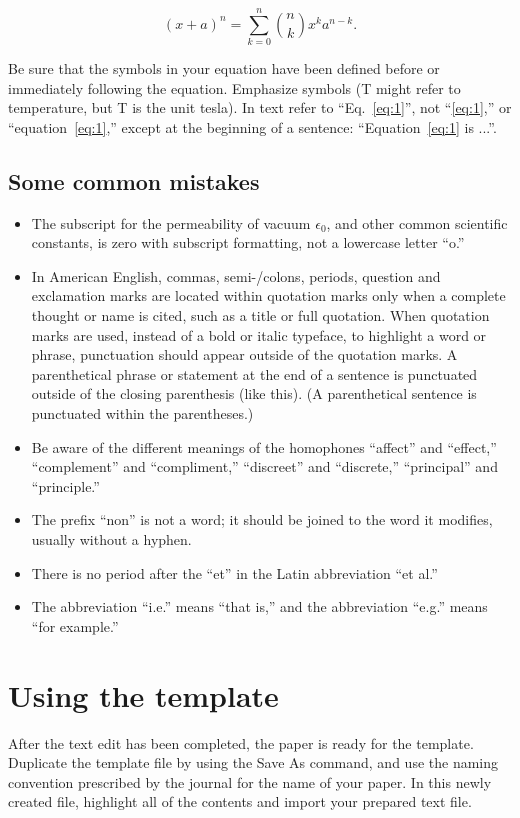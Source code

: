 \documentclass[10pt,twoside,twocolumn,a4paper]{article}
\begin{document}
\begin{equation} \label{eq:1}
(x + a)^n = \sum_{k=0}^{n} \binom{n}{k} x^k a^{n-k}.
\end{equation}

 Be sure that the symbols in your equation have been defined before or immediately following the equation. Emphasize symbols (T might refer to temperature, but T is the unit tesla). In text refer to ``Eq.~\eqref{eq:1}'', not ``\eqref{eq:1},'' or ``equation~\eqref{eq:1},'' except at the beginning of a sentence: ``Equation~\eqref{eq:1} is ...''.


\subsection{Some common mistakes}
\begin{itemize}
\item The subscript for the permeability of vacuum $\epsilon_0$, and other common scientific constants, is zero with subscript formatting, not a lowercase letter “o.”
\item In American English, commas, semi-/colons, periods, question and exclamation marks are located within quotation marks only when a complete thought or name is cited, such as a title or full quotation. When quotation marks are used, instead of a bold or italic typeface, to highlight a word or phrase, punctuation should appear outside of the quotation marks. A parenthetical phrase or statement at the end of a sentence is punctuated outside of the closing parenthesis (like this). (A parenthetical sentence is punctuated within the parentheses.)
\item Be aware of the different meanings of the homophones “affect” and “effect,” “complement” and “compliment,” “discreet” and “discrete,” “principal” and “principle.”
\item The prefix “non” is not a word; it should be joined to the word it modifies, usually without a hyphen.
\item There is no period after the “et” in the Latin abbreviation “et al.”
\item The abbreviation ``i.e.'' means ``that is,'' and the abbreviation ``e.g.'' means ``for example.'' 
\end{itemize}


\section{Using the template}
After the text edit has been completed, the paper is ready for the template. Duplicate the template file by using the Save As command, and use the naming convention prescribed by the journal for the name of your paper. In this newly created file, highlight all of the contents and import your prepared text file.
\end{document}
